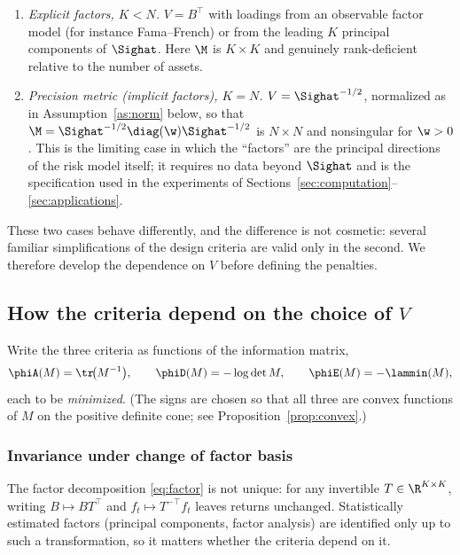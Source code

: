 \begin{example}
\label{ex:Vchoices}
\begin{enumerate}[leftmargin=1.6em,itemsep=0.2em]
  \item \emph{Explicit factors, $K<N$.} $V=B^\top$ with loadings from an
    observable factor model (for instance Fama--French) or from the leading $K$
    principal components of $\Sighat$. Here $\M$ is $K\times K$ and genuinely
    rank-deficient relative to the number of assets.
  \item \emph{Precision metric (implicit factors), $K=N$.}
    $V=\Sighat^{-1/2}$, normalized as in Assumption~\ref{as:norm} below, so that
    $\M=\Sighat^{-1/2}\diag(\w)\Sighat^{-1/2}$ is $N\times N$ and nonsingular for
    $\w>0$. This is the limiting case in which the ``factors'' are the principal
    directions of the risk model itself; it requires no data beyond $\Sighat$ and
    is the specification used in the experiments of
    Sections~\ref{sec:computation}--\ref{sec:applications}.
\end{enumerate}
\end{example}

These two cases behave differently, and the difference is not cosmetic: several
familiar simplifications of the design criteria are valid only in the second. We
therefore develop the dependence on $V$ before defining the penalties.

\subsection{How the criteria depend on the choice of $V$}
\label{sec:Vchoice}

Write the three criteria as functions of the information matrix,
\begin{equation}
  \phiA(M)=\tr\!\big(M^{-1}\big),\qquad
  \phiD(M)=-\log\det M,\qquad
  \phiE(M)=-\lammin(M),
  \label{eq:criteria}
\end{equation}
each to be \emph{minimized}. (The signs are chosen so that all three are convex
functions of $M$ on the positive definite cone; see
Proposition~\ref{prop:convex}.)

\subsubsection{Invariance under change of factor basis}

The factor decomposition \eqref{eq:factor} is not unique: for any invertible
$T\in\R^{K\times K}$, writing $B\mapsto BT^\top$ and $f_t\mapsto T^{-\top}f_t$
leaves returns unchanged. Statistically estimated factors (principal components,
factor analysis) are identified only up to such a transformation, so it matters
whether the criteria depend on it.

